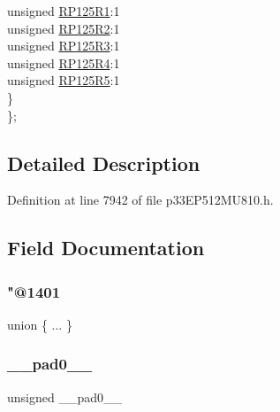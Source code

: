\begin{DoxyCompactItemize}
\begin{tabbing}
\>\>unsigned \hyperlink{structtag_r_p_o_r14_b_i_t_s_a950a558ad3569d854c3aaf4fbb7638e7}{RP125R1}:1\\
\>\>unsigned \hyperlink{structtag_r_p_o_r14_b_i_t_s_a1b5d7ffbed2e7aef824db75a7b500e0e}{RP125R2}:1\\
\>\>unsigned \hyperlink{structtag_r_p_o_r14_b_i_t_s_afa2eb875cbb22d787c3fc193de128d74}{RP125R3}:1\\
\>\>unsigned \hyperlink{structtag_r_p_o_r14_b_i_t_s_aa66d29ab7f00d390741fdac50f3daf0f}{RP125R4}:1\\
\>\>unsigned \hyperlink{structtag_r_p_o_r14_b_i_t_s_a3ed743632ae62c645eb9e6b52184c0a5}{RP125R5}:1\\
\>\} \\
\}; \\

\end{tabbing}\end{DoxyCompactItemize}


\subsection{Detailed Description}


Definition at line 7942 of file p33\+E\+P512\+M\+U810.\+h.



\subsection{Field Documentation}
\mbox{\label{structtag_r_p_o_r14_b_i_t_s_a34a6079acd14a6ced10a2523c6dd0d2a}} 
\subsubsection{\texorpdfstring{"@1401}{@1401}}
{\footnotesize\ttfamily union \{ ... \} }

\mbox{\label{structtag_r_p_o_r14_b_i_t_s_adf71f3d8410c1f1dbbc96680a92c49af}} 
\subsubsection{\texorpdfstring{\+\_\+\+\_\+pad0\+\_\+\+\_\+}{\_\_pad0\_\_}}
{\footnotesize\ttfamily unsigned \+\_\+\+\_\+pad0\+\_\+\+\_\+}



